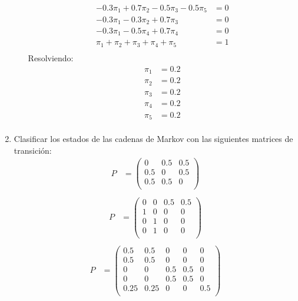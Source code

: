 \documentclass{templateNote}
\begin{document}
\begin{enumerate}
\begin{enumerate}[label=\alph*)]
\begin{align*}
            - 0.3\pi_1 + 0.7\pi_2 - 0.5\pi_3 - 0.5\pi_5 &= 0\\
            - 0.3\pi_1 - 0.3\pi_2 + 0.7\pi_3 &= 0\\
            - 0.3\pi_1 - 0.5\pi_4 + 0.7\pi_4 &= 0\\
            \pi_1 + \pi_2 + \pi_3 + \pi_4 + \pi_5 &= 1\\
        \end{align*}
        Resolviendo:
        \begin{align*}
            \pi_1 &= 0.2\\
            \pi_2 &= 0.2\\
            \pi_3 &= 0.2\\
            \pi_4 &= 0.2\\
            \pi_5 &= 0.2\\
        \end{align*}
        
    \end{enumerate}

    \newpage
    \item Clasificar los estados de las cadenas de Markov con las siguientes matrices de transición:
    \begin{align*}
        P &= \left(
            \begin{array}{ccc}
                0 & 0.5 & 0.5 \\
                0.5 & 0   & 0.5 \\
                0.5 & 0.5 & 0   \\
            \end{array}
            \right)\\
    \end{align*}
    \begin{align*}
        P &= \left(
            \begin{array}{cccc}
                0   & 0   & 0.5 & 0.5\\
                1   & 0   & 0   & 0\\
                0   & 1   & 0   & 0\\
                0   & 1   & 0   & 0\\
            \end{array}
            \right)\\
    \end{align*}
    \begin{align*}
        P &= \left(
            \begin{array}{ccccc}    
                0.5 & 0.5 & 0   & 0   & 0\\
                0.5 & 0.5 & 0   & 0   & 0\\
                0   & 0   & 0.5 & 0.5 & 0\\
                0   & 0   & 0.5 & 0.5 & 0\\
                0.25& 0.25& 0   & 0   & 0.5\\
            \end{array}
            \right)\\
    \end{align*}


\end{enumerate}
\end{document}
